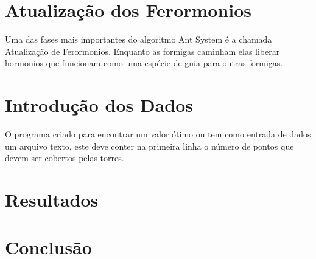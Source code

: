 \documentclass[12pt]{article}
\begin{document}
\section{Atualização dos Ferormonios}

Uma das fases mais importantes do algoritmo Ant System é a chamada Atualização
de Ferormonios. Enquanto as formigas caminham elas liberar hormonios que funcionam
como uma espécie de guia para outras formigas.

\section{Introdução dos Dados}

O programa criado para encontrar um valor ótimo ou tem como entrada de dados
um arquivo texto, este deve conter na primeira linha o número de pontos que
devem ser cobertos pelas torres.

\section{Resultados}\label{sec:figs}

\section{Conclusão}
\end{document}
